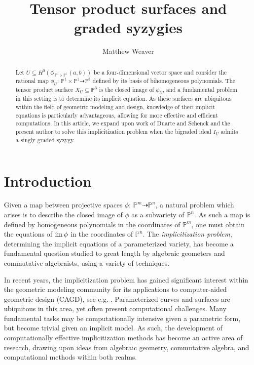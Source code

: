 \documentclass[reqno]{amsart}
\title{Tensor product surfaces and graded syzygies}
\author{Matthew Weaver}
\date{}
\numberwithin{equation}{section}
\theoremstyle{definition}
\def\O{\mathcal{O}}
\def\P{\mathbb{P}}
\def\im{\mathop{\rm im}}
\begin{document}
\begin{abstract}
Let $U\subseteq H^0(\O_{\P^1\times \P^1}(a,b))$ be a four-dimensional vector space and consider the rational map $\phi_U:\,\P^1\times \P^1 \dashrightarrow \P^3$ defined by its basis of bihomogeneous polynomials. The tensor product surface $X_U\subseteq \P^3$ is the closed image of $\phi_U$, and a fundamental problem in this setting is to determine its implicit equation. As these surfaces are ubiquitous within the field of geometric modeling and design, knowledge of their implicit equations is particularly advantageous, allowing for more effective and efficient computations. In this article, we expand upon work of Duarte and Schenck \cite{DS16} and the present author \cite{Weaver25} to solve this implicitization problem when the bigraded ideal $I_U$ admits a singly graded syzygy.
\end{abstract}



\maketitle








\section{Introduction}

Given a map between projective spaces $\phi:\,\P^m\dashrightarrow\P^n$, a natural problem which arises is to describe the closed image of $\phi$ as a subvariety of $\P^n$. As such a map is defined by homogeneous polynomials in the coordinates of $\P^m$, one must obtain the equations of $\im \phi$ in the coordinates of $\P^n$. The \textit{implicitization problem}, determining the implicit equations of a parameterized variety, has become a fundamental question studied to great length by algebraic geometers and commutative algebraists, using a variety of techniques. 


In recent years, the implicitization problem has gained significant interest within the geometric modeling community for its applications to computer-aided geometric design (CAGD), see e.g. \cite{CGZ00,SC95,SGD97,SSQK94}. Parameterized curves and surfaces are ubiquitous in this area, yet often present computational challenges. Many fundamental tasks may be computationally intensive given a parametric form, but become trivial given an implicit model. As such, the development of computationally effective implicitization methods has become an active area of research, drawing upon ideas from algebraic geometry, commutative algebra, and computational methods within both realms.
\end{document}
